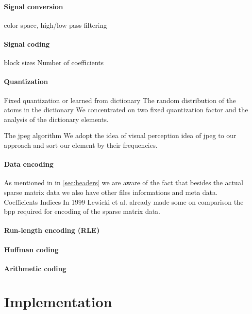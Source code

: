 \paragraph{Signal conversion}
color space, high/low pass filtering

\paragraph{Signal coding}

block sizes
Number of coefficients


\paragraph{Quantization}
Fixed quantization or learned from dictionary
The random distribution of the atoms in the dictionary 
We concentrated on two fixed quantization factor and the analysis of the dictionary elements.

The jpeg algorithm 
We adopt the idea of visual perception idea of jpeg to our approach and sort our element by their frequencies.

\paragraph{Data encoding}
As mentioned in in \ref{sec:headers} we are aware of the fact that besides the actual sparse matrix data we also have other files informations and meta data.
Coefficients
Indices
In 1999 Lewicki et al. \cite{Lewicki1999} already made some on comparison the bpp required for encoding of the sparse matrix data.
\cite{Murray2006}

\paragraph{Run-length encoding (RLE)}
\paragraph{Huffman coding}
\paragraph{Arithmetic coding}





\section{Implementation}
%


